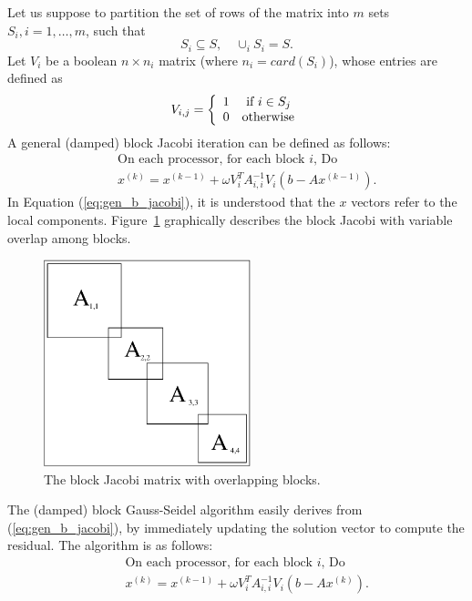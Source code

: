 Let us suppose to partition the set of rows of 
the matrix into $m$ sets $S_i, i=1, \ldots,m$, such that
\[
S_i \subseteq S, \quad \cup_i S_i = S.
\]
Let $V_i$ be a
boolean $n \times n_i$ matrix (where $n_i = card(S_i)$), whose entries are
defined as
\[
V_{i,j} = \left\{
\begin{array}{l l}
1 & \mbox{ if } i \in S_j \\
  0 & \mbox{otherwise}
\end{array}
  \right.
\]
A general (damped) block Jacobi iteration can be defined as follows:
\begin{eqnarray}
&& \mbox{On each processor, for each block $i$, Do} \\
&& \label{eq:gen_b_jacobi}
x^{(k)} = x^{(k-1)} + \omega V_i^T A_{i,i}^{-1} V_i(b - A x^{(k-1)}).
\end{eqnarray}
In Equation (\ref{eq:gen_b_jacobi}), it is understood that the $x$ vectors
refer to the local components.
Figure~\ref{fig:bj} graphically describes the block Jacobi with variable
overlap among blocks.

\begin{figure}
\begin{center}
\includegraphics[width=6cm]{bj.eps}
\end{center}
\caption{The block Jacobi matrix with overlapping blocks.}
\label{fig:bj}
\end{figure}

The (damped) block Gauss-Seidel algorithm easily derives from
(\ref{eq:gen_b_jacobi}), by immediately updating the solution vector to
compute the residual. The algorithm is as follows:
\begin{eqnarray}
&& \mbox{On each processor, for each block $i$, Do} \\
&& \label{eq:gen_b_gs}
x^{(k)} = x^{(k-1)} + \omega V_i^T A_{i,i}^{-1} V_i(b - A x^{(k)}).
\end{eqnarray}

